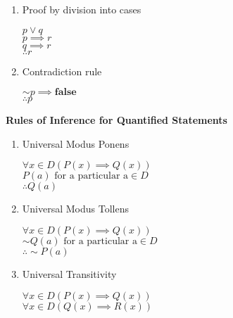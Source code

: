 \documentclass[landscape, a4paper]{article}
\newcommand{\Or}{\vee}
\newcommand{\false}{\textbf{false}}
\newcommand{\heading}[1]{
    \noindent\textbf{#1}
}
\newenvironment{wenumerate}{\begin{enumerate}[wide, labelindent=2pt]}{\end{enumerate}}
\begin{document}
\begin{multicols*}{4}
\begin{wenumerate}
        \vspace{-4pt} \par {\centering
            $p\implies q$ \\
            $q \implies r$ \\
            $\therefore p \implies r $ \par
        }
        \item Proof by division into cases
        \vspace{-4pt} \par {\centering
            $p\Or q$ \\
            $p\implies r$ \\
            $q\implies r$ \\
            $\therefore r $ \par
        }
        \item Contradiction rule\\
        \vspace{-16pt} \par {\centering
            ${\sim} p \implies \false$ \\
            $\therefore p $ \par
        }
    \end{wenumerate}
    \heading{Rules of Inference for Quantified Statements}
    \begin{wenumerate}
        \item Universal Modus Ponens
        \par {\centering
            $\forall x\in D (P(x)\implies Q(x))$\\
            $P(a) \text{ for a particular a}\in D$\\
            $\therefore Q(a)$\par
        }
        \item Universal Modus Tollens
        \par {\centering
            $\forall x\in D (P(x)\implies Q(x))$        \\
            ${\sim} Q(a) \text{ for a particular a}\in D$ \\
            $\therefore {\sim} P(a)$ \par
        }
        \item Universal Transitivity
        \par {\centering
            $\forall x\in D (P(x)\implies Q(x))$        \\
            $\forall x\in D (Q(x)\implies R(x))$        \\
}
\end{wenumerate}
\end{multicols*}
\end{document}
